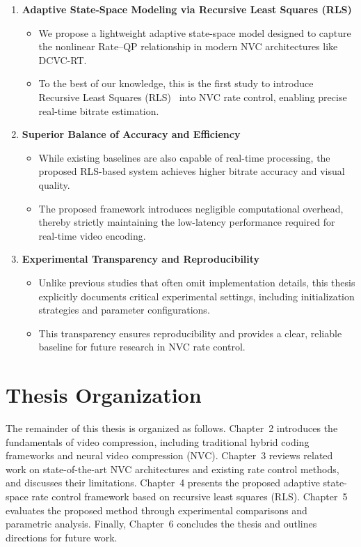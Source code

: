 \begin{enumerate}
    \item \textbf{Adaptive State-Space Modeling via Recursive Least Squares (RLS)}
    \begin{itemize}
        \item We propose a lightweight adaptive state-space model designed to capture the nonlinear Rate–QP relationship in modern NVC architectures like DCVC-RT.
        \item To the best of our knowledge, this is the first study to introduce Recursive Least Squares (RLS)~\cite{62} into NVC rate control, enabling precise real-time bitrate estimation.
    \end{itemize}

    \item \textbf{Superior Balance of Accuracy and Efficiency}
    \begin{itemize}
        \item While existing baselines are also capable of real-time processing, the proposed RLS-based system achieves higher bitrate accuracy and visual quality.
        \item The proposed framework introduces negligible computational overhead, thereby strictly maintaining the low-latency performance required for real-time video encoding.
    \end{itemize}

    \item \textbf{Experimental Transparency and Reproducibility}
    \begin{itemize}
        \item Unlike previous studies that often omit implementation details, this thesis explicitly documents critical experimental settings, including initialization strategies and parameter configurations.
        \item This transparency ensures reproducibility and provides a clear, reliable baseline for future research in NVC rate control.
    \end{itemize}
\end{enumerate}

\section{Thesis Organization}
The remainder of this thesis is organized as follows. 
Chapter~2 introduces the fundamentals of video compression, including traditional hybrid coding frameworks 
and neural video compression (NVC). 
Chapter~3 reviews related work on state-of-the-art NVC architectures and existing rate control methods, 
and discusses their limitations. 
Chapter~4 presents the proposed adaptive state-space rate control framework based on recursive least squares (RLS). 
Chapter~5 evaluates the proposed method through experimental comparisons and parametric analysis. 
Finally, Chapter~6 concludes the thesis and outlines directions for future work.
